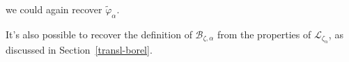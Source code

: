 \documentclass{article}
\theoremstyle{definition}
\newcommand{\maps}{\colon}
\newcommand{\C}{\mathbb{C}}
\newcommand{\series}[1]{\tilde{#1}}
\newcommand{\laplace}{\mathcal{L}}
\newcommand{\borel}{\mathcal{B}}
\begin{document}
we could again recover $\series{\varphi}_\alpha$. 

It's also possible to recover the definition of $\mathcal{B}_{\zeta,\alpha}$ from the properties of $\laplace_{\zeta_\alpha}$, as discussed in Section~\ref{transl-borel}.





\end{document}

